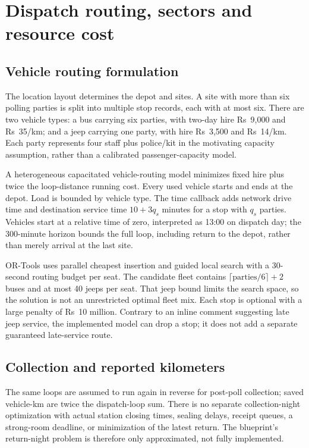 \documentclass[11pt,a4paper,oneside]{report}
\newcommand{\source}[1]{\par\nopagebreak[4]{\footnotesize\color{teal}Evidence: #1.}\par}
\begin{document}
\chapter{Dispatch routing, sectors and resource cost}
\section{Vehicle routing formulation}
The location layout determines the depot and sites. A site with more than six polling parties is split into multiple stop records, each with at most six. There are two vehicle types: a bus carrying six parties, with two-day hire Rs~9,000 and Rs~35/km; and a jeep carrying one party, with hire Rs~3,500 and Rs~14/km. Each party represents four staff plus police/kit in the motivating capacity assumption, rather than a calibrated passenger-capacity model.

A heterogeneous capacitated vehicle-routing model minimizes fixed hire plus twice the loop-distance running cost. Every used vehicle starts and ends at the depot. Load is bounded by vehicle type. The time callback adds network drive time and destination service time $10+3q_s$ minutes for a stop with $q_s$ parties. Vehicles start at a relative time of zero, interpreted as 13:00 on dispatch day; the 300-minute horizon bounds the full loop, including return to the depot, rather than merely arrival at the last site.

OR-Tools uses parallel cheapest insertion and guided local search with a 30-second routing budget per seat. The candidate fleet contains $\lceil\text{parties}/6\rceil+2$ buses and at most 40 jeeps per seat. That jeep bound limits the search space, so the solution is not an unrestricted optimal fleet mix. Each stop is optional with a large penalty of Rs~10 million. Contrary to an inline comment suggesting late jeep service, the implemented model can drop a stop; it does not add a separate guaranteed late-service route.
\source{[S10]}

\section{Collection and reported kilometers}
The same loops are assumed to run again in reverse for post-poll collection; saved vehicle-km are twice the dispatch-loop sum. There is no separate collection-night optimization with actual station closing times, sealing delays, receipt queues, a strong-room deadline, or minimization of the latest return. The blueprint's return-night problem is therefore only approximated, not fully implemented.
\end{document}
